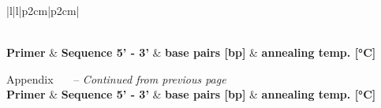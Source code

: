 \begin{spacing}{1}{
        \footnotesize
        \newcommand{\myheader}{%
            \hline
            \textbf{Primer} & \textbf{Sequence 5' - 3'}  & \textbf{base pairs [bp]} & \textbf{annealing temp. [°C]}      \\
            \hline
        }

        \begin{longtable}{|l|l|p{2cm}|p{2cm}|}
            \caption{%
                List of primers. Some primers required a melting step to be
                performed before fluorescent readout to remove byproducts.
            }
            \label{tab:primerList}                                                                                                                                                      \\
            \myheader
            \endfirsthead

            {{Appendix \thesection~\tablename\ \thetable\ -- \textit{Continued from previous page}}}                                                                                    \\
            \myheader
            \endhead

            \hline
                                                                                                                                          \\
            \endfoot

            \hline \hline
            \endlastfoot


\end{longtable}}
\end{spacing}
